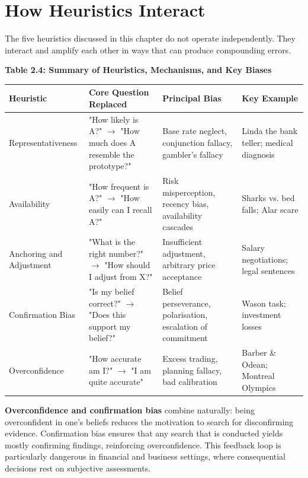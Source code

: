 \documentclass[12pt, letterpaper]{article}
\begin{document}
\medskip


\section{How Heuristics Interact}


The five heuristics discussed in this chapter do not operate independently. They interact and amplify each other in ways that can produce compounding errors.

\textbf{Table 2.4: Summary of Heuristics, Mechanisms, and Key Biases}


\begin{table}[H]
\centering
\small
\begin{tabularx}{\linewidth}{lYYY}
\toprule
Heuristic & Core Question Replaced & Principal Bias & Key Example \\
\midrule
Representativeness & "How likely is A?" $\rightarrow$ "How much does A resemble the prototype?" & Base rate neglect, conjunction fallacy, gambler's fallacy & Linda the bank teller; medical diagnosis \\
Availability & "How frequent is A?" $\rightarrow$ "How easily can I recall A?" & Risk misperception, recency bias, availability cascades & Sharks vs. bed falls; Alar scare \\
Anchoring and Adjustment & "What is the right number?" $\rightarrow$ "How should I adjust from X?" & Insufficient adjustment, arbitrary price acceptance & Salary negotiations; legal sentences \\
Confirmation Bias & "Is my belief correct?" $\rightarrow$ "Does this support my belief?" & Belief perseverance, polarisation, escalation of commitment & Wason task; investment losses \\
Overconfidence & "How accurate am I?" $\rightarrow$ "I am quite accurate" & Excess trading, planning fallacy, bad calibration & Barber \& Odean; Montreal Olympics \\
\bottomrule
\end{tabularx}
\end{table}


\textbf{Overconfidence and confirmation bias} combine naturally: being overconfident in one's beliefs reduces the motivation to search for disconfirming evidence. Confirmation bias ensures that any search that is conducted yields mostly confirming findings, reinforcing overconfidence. This feedback loop is particularly dangerous in financial and business settings, where consequential decisions rest on subjective assessments.
\end{document}
